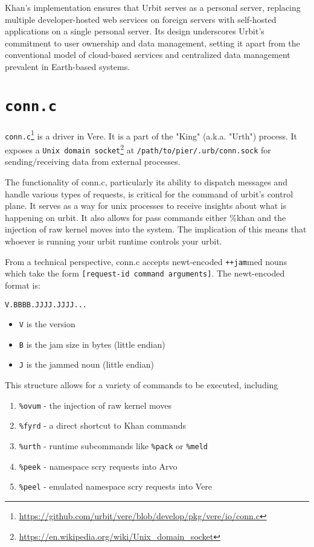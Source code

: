 \documentclass[twoside]{article}
\begin{document}
Khan's implementation ensures that Urbit serves as a personal server, replacing multiple developer-hosted web services on foreign servers with self-hosted applications on a single personal server. Its design underscores Urbit's commitment to user ownership and data management, setting it apart from the conventional model of cloud-based services and centralized data management prevalent in Earth-based systems.

\section{\texttt{conn.c}} 

\texttt{conn.c}\footnote{\url{https://github.com/urbit/vere/blob/develop/pkg/vere/io/conn.c}} is a driver in Vere. It is a part of the "King" (a.k.a. "Urth") process. It exposes a \texttt{Unix domain socket}\footnote{\url{https://en.wikipedia.org/wiki/Unix_domain_socket}} at \texttt{/path/to/pier/.urb/conn.sock} for sending/receiving data from external processes.

The functionality of conn.c, particularly its ability to dispatch messages and handle various types of requests, is critical for the command of urbit's control plane. It serves as a way for unix processes to receive insights about what is happening on urbit. It also allows for pass commands either \%khan and the injection of raw kernel moves into the system. The implication of this means that whoever is running your urbit runtime controls your urbit. 

From a technical perspective, conn.c accepts newt-encoded \texttt{++jam}med nouns which take the form \texttt{[request-id command arguments]}. 
The newt-encoded format is:

\begin{verbatim}
V.BBBB.JJJJ.JJJJ...
\end{verbatim}

\begin{itemize}
  \item \texttt{V} is the version
  \item \texttt{B} is the jam size in bytes (little endian)
  \item \texttt{J} is the jammed noun (little endian)
\end{itemize}

This structure allows for a variety of commands to be executed, including 

\begin{enumerate}
  \item \texttt{\%ovum} - the injection of raw kernel moves 
  \item \texttt{\%fyrd} - a direct shortcut to Khan commands
  \item \texttt{\%urth} - runtime subcommands like \texttt{\%pack} or \texttt{\%meld}
  \item \texttt{\%peek} - namespace scry requests into Arvo
  \item \texttt{\%peel} - emulated namespace scry requests into Vere
\end{enumerate}
\end{document}
